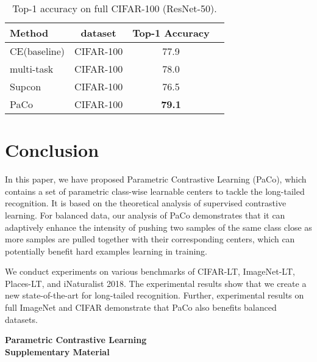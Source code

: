 \documentclass[10pt,twocolumn,letterpaper]{article}
\begin{document}
\begin{table}
	\centering
	\caption{Top-1 accuracy on full CIFAR-100 (ResNet-50).}
	\label{tab:full_cifar}
	\resizebox{.76\linewidth}{!}
	{
		\begin{tabular}{lccc}
			\toprule
			Method & dataset &Top-1 Accuracy \\
			\midrule
			CE(baseline)    &CIFAR-100    &77.9 \\
			multi-task      &CIFAR-100    &78.0 \\
			\midrule
			Supcon          &CIFAR-100    &76.5 \\
			PaCo             &CIFAR-100    &\textbf{79.1} \\
			\bottomrule
		\end{tabular}
	}
\end{table}


\section{Conclusion}
\vspace{-0.1in}
In this paper, we have proposed Parametric Contrastive Learning (PaCo), which contains a set of parametric class-wise learnable centers to tackle the long-tailed recognition. It is based on the theoretical analysis of supervised contrastive learning. For balanced data, our analysis of PaCo demonstrates that it can adaptively enhance the intensity of pushing two samples of the same class close as more samples are pulled together with their corresponding centers, which can potentially benefit hard examples learning in training. 

We conduct experiments on various benchmarks of CIFAR-LT, ImageNet-LT, Places-LT, and iNaturalist 2018. The experimental results show that we create a new state-of-the-art for long-tailed recognition. Further, experimental results on full ImageNet and CIFAR demonstrate that PaCo also benefits balanced datasets.






{\small
	
	
}

\newpage
\onecolumn
\appendix

\begin{center}
	\Large \textbf{Parametric Contrastive Learning}
	\Large \\ \textbf{Supplementary Material}
\end{center}
\vspace{20pt}
\end{document}
